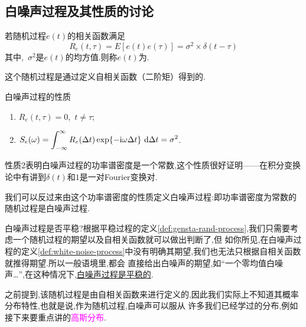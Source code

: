\documentclass[cn,10pt,citestyle=gb7714-2015,bibstyle=gb7714-2015]{elegantbook}
\newcommand{\md}{\ \mathrm{d}}
\newcommand{\image}{\textup{i}}
\begin{document}
\subsection{白噪声过程及其性质的讨论}
\begin{definition}[白噪声过程]\label{def:white-noise-process}
  若随机过程$e(t)$的相关函数满足
  \begin{equation}
    R_e(t,\tau)=E[e(t)e(\tau)]=\sigma^2\times\delta(t-\tau)
  \end{equation}
  其中,\ $\sigma^2$是$e(t)$的均方值.则称$e(t)$为.
\end{definition}
\begin{note}
  这个随机过程是通过定义自相关函数（二阶矩）得到的.
\end{note}
\begin{property}白噪声过程的性质
  \begin{enumerate}
    \item $R_e(t,\tau)= 0$,\ $t\neq\tau$;
    \item $\displaystyle S_e(\omega)=\int_{-\infty}^\infty R_e(\Delta t)\exp\{-\image\omega\Delta t\}\md\Delta t=\sigma^2$.
  \end{enumerate}
\end{property}
性质2表明白噪声过程的功率谱密度是一个常数,这个性质很好证明——在积分变换论中有讲到$\delta(t)$和$1$是一对\textup{Fourier}变换对.

我们可以反过来由这个功率谱密度的性质定义白噪声过程:即\colorbox{yellow!20}{功率谱密度为常数的随机过程是白噪声过程}.

白噪声过程是否平稳?根据平稳过程的定义\ref{def:gensta-rand-process},我们只需要考虑一个随机过程的期望以及自相关函数就可以做出判断了,但
如你所见,在白噪声过程的定义\ref{def:white-noise-process}中没有明确其期望,我们也无法只根据自相关函数就推得期望.所以一般语境里,都会
直接给出白噪声的期望,如“一个零均值白噪声\ldots”,在这种情况下,\uline{白噪声过程是平稳的}.
\begin{note}
  之前提到,该随机过程是由自相关函数来进行定义的,因此我们实际上不知道其概率分布特性,也就是说,作为随机过程,白噪声可以服从
许多我们已经学过的分布,例如接下来要重点讲的\textcolor{magenta}{高斯分布}.
\end{note}
\end{document}

